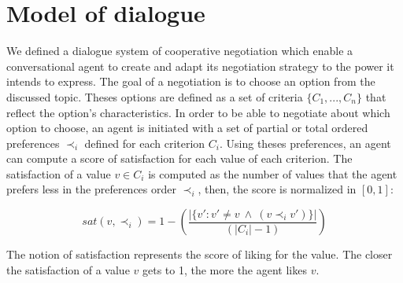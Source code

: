 \documentclass{llncs}
\begin{document}
	\begin{abstract}
		
	\end{abstract}
%	
%	
	
	\section{Model of dialogue}
		
		We defined a dialogue system of cooperative negotiation which enable  a conversational agent to create and adapt its negotiation strategy to the power it intends to express. The goal of a negotiation is to choose an option from the discussed topic. Theses options are defined as a set of criteria  $\{C_1, ..., C_n\}$ that reflect the option's characteristics. In order to be able to negotiate about which option to choose, an agent is initiated with a set of partial or total ordered preferences $\prec_i$ defined for each criterion $C_i$. Using theses preferences, an agent can compute a score of satisfaction for each value of each criterion. The satisfaction of a value $v \in C_i$ is computed as the number of values that the agent prefers less in the preferences order $\prec_i$, then, the score is normalized in $[0, 1]$: 
		
				\begin{equation}
				sat(v, \prec_i) =	1 - \left( \frac{|\{v' : v' \neq v \  \wedge \ (v \prec_i v')\}| }{( |C_i| - 1 )}\right)
				\end{equation}
				
		The notion of satisfaction represents the score of liking for the value. The closer the satisfaction of a value $v$ gets to 1, the more the agent likes $v$. 
		
\end{document}
